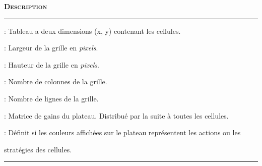 \documentclass[a4paper]{article}
\begin{document}
\vspace{0.25cm}
\begin{description}[labelwidth=2.50cm]
    \small
    \item[\textbf{\textsc{Champ}}] \textbf{\textsc{Description}}
    \vspace{0.1cm}
    \hrule{}
    \item[\texttt{cells}]           :  Tableau a deux dimensions (x, y) contenant les cellules.
    \item[\texttt{width}]           :  Largeur de la grille en \textit{pixels}.
    \item[\texttt{height}]          :  Hauteur de la grille en \textit{pixels}.
    \item[\texttt{nbCols}]          :  Nombre de colonnes de la grille.
    \item[\texttt{nbLines}]         :  Nombre de lignes de la grille.
    \item[\texttt{payoffMatrix}]    :  Matrice de gains du plateau. Distribué par la suite à toutes les cellules.
    \item[\texttt{colorMode}]       :  Définit si les couleurs affichées sur le plateau représentent les actions ou les 
    \item[]\hspace{2.5pt}              stratégies des cellules.
\end{description}
\hrule{}
\vspace{0.5cm}
\end{document}
